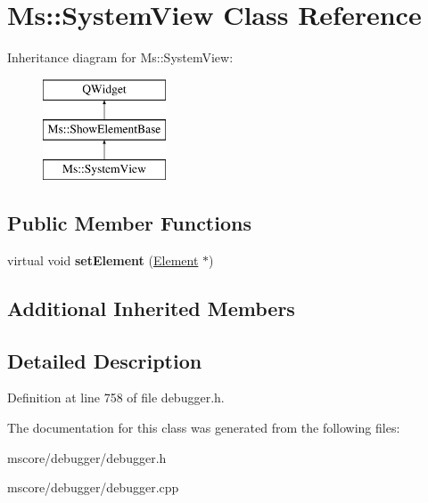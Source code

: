 \hypertarget{class_ms_1_1_system_view}{}\section{Ms\+:\+:System\+View Class Reference}
\label{class_ms_1_1_system_view}
Inheritance diagram for Ms\+:\+:System\+View\+:\begin{figure}[H]
\begin{center}
\leavevmode
\includegraphics[height=3.000000cm]{class_ms_1_1_system_view}
\end{center}
\end{figure}
\subsection*{Public Member Functions}
\begin{DoxyCompactItemize}
\item 
\mbox{\label{class_ms_1_1_system_view_a43d2ffbcda75711ff0e27795eaa4966f}} 
virtual void {\bfseries set\+Element} (\hyperlink{class_ms_1_1_element}{Element} $\ast$)
\end{DoxyCompactItemize}
\subsection*{Additional Inherited Members}


\subsection{Detailed Description}


Definition at line 758 of file debugger.\+h.



The documentation for this class was generated from the following files\+:\begin{DoxyCompactItemize}
\item 
mscore/debugger/debugger.\+h\item 
mscore/debugger/debugger.\+cpp\end{DoxyCompactItemize}
